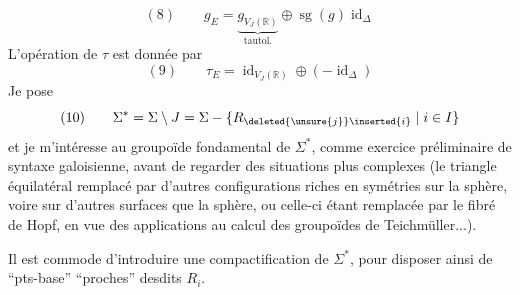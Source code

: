 \[
(8)\qquad g_E=\underbrace{g_{V_J(\mathbb R)}}_{\text{tautol.}}\oplus\operatorname{sg}(g)\operatorname{id}_\Delta
\]
L'opération de $\tau$ est donnée par
\[
(9)\qquad\tau_E=\operatorname{id}_{V_J(\mathbb R)}\oplus(-\operatorname{id}_\Delta)
\]
Je pose
\[
(10)\qquad\Sigma^*=\Sigma\setminus J=\Sigma-\{R_{\deleted{\unsure{j}}\inserted{i}}\mid i\in I\}
\]
et je m'intéresse au groupoïde fondamental de $\Sigma^*$, comme exercice préliminaire de syntaxe galoisienne, avant de regarder des situations  plus complexes (le triangle équilatéral remplacé par d'autres configurations riches en symétries sur la sphère, voire sur d'autres surfaces que la sphère, ou celle-ci étant remplacée par le fibré de Hopf, en vue des applications au calcul des groupoïdes de Teichmüller...).

Il est commode d'introduire une compactification de $\Sigma^*$, pour disposer ainsi de ``pts-base'' ``proches'' desdits $R_i$.
